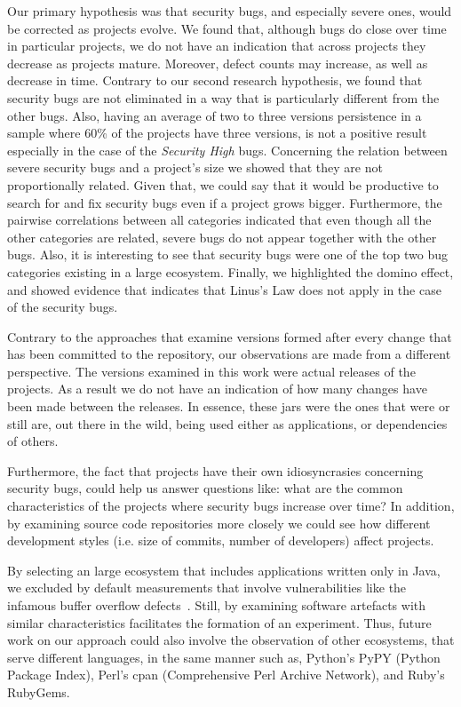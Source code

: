 \documentclass[letterpaper,twocolumn,10pt]{article}
\begin{document}
Our primary hypothesis was that security bugs, and especially severe
ones, would be corrected as projects evolve. We found that, although
bugs do close over time in particular projects, we do not have an indication that across
projects they decrease as projects mature. Moreover, defect counts may
increase, as well as decrease in time. Contrary to our second research hypothesis,
we found that security
bugs are not eliminated in a way that is particularly different from the other bugs.
Also, having an average of two to three versions persistence in a sample where 60\%
of the projects have three versions, is not a positive result especially in the
case of the {\it Security High} bugs. Concerning the relation between
severe security bugs and a project's size
we showed that they are not proportionally related.
Given that, we could say that it would be productive to search for and fix
security bugs even if a project grows bigger.
Furthermore, the pairwise correlations between all categories
indicated that even though all the other
categories are related, severe bugs do not appear together with the other bugs.
Also, it is interesting to see that security bugs were one of the top two
bug categories existing in a large ecosystem. Finally, we highlighted the
domino effect, and showed evidence that indicates that Linus's Law does not
apply in the case of the security bugs.

Contrary to the approaches that examine versions
formed after every change that has been committed to the repository,
our observations are made from a different perspective.
The versions examined in this work were actual releases
of the projects. As a result we do not have an indication of how many changes
have been made between the releases.
In essence, these {\sc jar}s were the ones that were or still are,
out there in the wild, being used either as applications,
or dependencies of others.

Furthermore, the fact that projects have their own idiosyncrasies concerning
security bugs, could help us answer questions like: what are the common
characteristics of the projects where security bugs increase over time?
In addition, by examining source code repositories more closely we could see how
different development styles (i.e. size of commits, number of developers)
affect projects.

By selecting an large ecosystem that includes applications written only
in Java, we excluded by default measurements that involve vulnerabilities like
the infamous buffer overflow defects~\cite{K11}. Still, by examining software
artefacts with similar characteristics facilitates the formation of
an experiment. Thus, future work on our approach could also involve
the observation of other ecosystems, that serve different languages,
in the same manner such as, Python's PyPY (Python Package Index),
Perl's {\sc cpan} (Comprehensive Perl Archive Network), and Ruby's
RubyGems.
\end{document}
